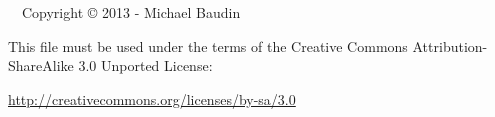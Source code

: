 %

\newpage
$\textrm{ }$
\vfill
Copyright \copyright{} 2013 - Michael Baudin

This file must be used under the terms of the 
Creative Commons Attribution-ShareAlike 3.0 Unported License:
\begin{center}
\url{http://creativecommons.org/licenses/by-sa/3.0}
\end{center}

\newpage


